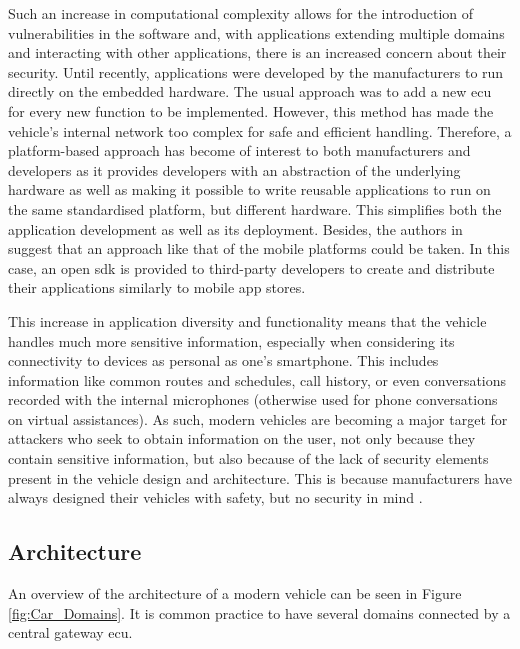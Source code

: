 Such an increase in computational complexity allows for the introduction of vulnerabilities in the software and, with applications extending multiple domains and interacting with other applications, there is an increased concern about their security. Until recently, applications were developed by the manufacturers to run directly on the embedded hardware. The usual approach was to add a new \gls{ecu} for every new function to be implemented. However, this method has made the vehicle’s internal network too complex for safe and efficient handling. Therefore, a platform-based approach has become of interest to both manufacturers and developers as it provides developers with an abstraction of the underlying hardware as well as making it possible to write reusable applications to run on the same standardised platform, but different hardware. This simplifies both the application development as well as its deployment. Besides, the authors in \cite{Holle} suggest that an approach like that of the mobile platforms could be taken. In this case, an open \gls{sdk} is provided to third-party developers to create and distribute their applications similarly to mobile app stores.\par

This increase in application diversity and functionality means that the vehicle handles much more sensitive information, especially when considering its connectivity to devices as personal as one’s smartphone. This includes information like common routes and schedules, call history, or even conversations recorded with the internal microphones (otherwise used for phone conversations on virtual assistances). As such, modern vehicles are becoming a major target for attackers who seek to obtain information on the user, not only because they contain sensitive information, but also because of the lack of security elements present in the vehicle design and architecture. This is because manufacturers have always designed their vehicles with safety, but no security in mind \citep{Siegel2018}.

\subsection{Architecture}

An overview of the architecture of a modern vehicle can be seen in Figure \ref{fig:Car_Domains}. It is common practice to have several domains connected by a central gateway \gls{ecu}.

